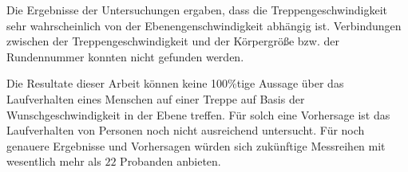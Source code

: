 	Die Ergebnisse der Untersuchungen ergaben, dass die Treppengeschwindigkeit sehr wahrscheinlich von der Ebenengenschwindigkeit abhängig ist. Verbindungen zwischen der Treppengeschwindigkeit und der Körpergröße bzw. der Rundennummer konnten nicht gefunden werden.
	
	Die Resultate dieser Arbeit können keine 100\%tige Aussage über das Laufverhalten eines Menschen auf einer Treppe auf Basis der Wunschgeschwindigkeit in der Ebene treffen. Für solch eine Vorhersage ist das Laufverhalten von Personen noch nicht ausreichend untersucht. Für noch genauere Ergebnisse und Vorhersagen würden sich zukünftige Messreihen mit wesentlich mehr als $22$ Probanden anbieten.
	

